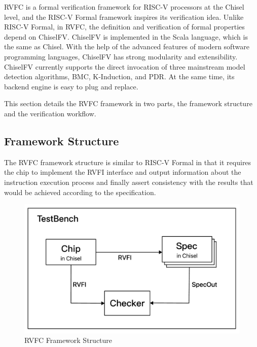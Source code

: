\documentclass[conference]{IEEEtran}
\theoremstyle{definition}
\begin{document}
RVFC is a formal verification framework for RISC-V processors at the Chisel level, and the RISC-V Formal framework inspires its verification idea.
Unlike RISC-V Formal, in RVFC, the definition and verification of formal properties depend on ChiselFV.
ChiselFV is implemented in the Scala language, which is the same as Chisel. With the help of the advanced features of modern software programming languages, ChiselFV has strong modularity and extensibility.
ChiselFV currently supports the direct invocation of three mainstream model detection algorithms, BMC, K-Induction, and PDR. At the same time, its backend engine is easy to plug and replace.

This section details the RVFC framework in two parts, the framework structure and the verification workflow.

\subsection{Framework Structure}
The RVFC framework structure is similar to RISC-V Formal in that it requires the chip to implement the RVFI interface and output information about the instruction execution process and finally assert consistency with the results that would be achieved according to the specification.

\begin{figure}[!htbp]
    \begin{center}
    \includegraphics[width=1\linewidth]{pics/rvfc.pdf}
    \caption{RVFC Framework Structure}
    \label{fig: rvfc structure}
    \end{center}
\end{figure}
\end{document}
